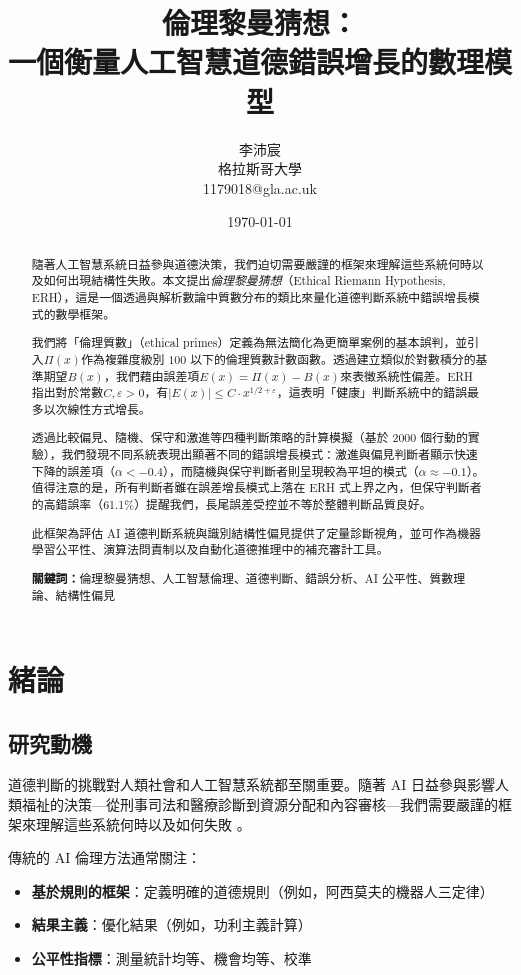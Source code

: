 \documentclass[12pt,a4paper]{article}
\title{倫理黎曼猜想：\\
       一個衡量人工智慧道德錯誤增長的數理模型}
\author{李沛宸 \\
        格拉斯哥大學 \\
        1179018@gla.ac.uk}
\date{\today}
\theoremstyle{definition}
\theoremstyle{remark}
\begin{document}
\maketitle

\begin{abstract}
隨著人工智慧系統日益參與道德決策，我們迫切需要嚴謹的框架來理解這些系統何時以及如何出現結構性失敗。本文提出\emph{倫理黎曼猜想}（Ethical Riemann Hypothesis, ERH），這是一個透過與解析數論中質數分布的類比來量化道德判斷系統中錯誤增長模式的數學框架。

我們將「倫理質數」（ethical primes）定義為無法簡化為更簡單案例的基本誤判，並引入$\Pi(x)$作為複雜度級別 $100$ 以下的倫理質數計數函數。透過建立類似於對數積分的基準期望$B(x)$，我們藉由誤差項$E(x) = \Pi(x) - B(x)$來表徵系統性偏差。ERH 指出對於常數$C, \varepsilon > 0$，有$|E(x)| \leq C \cdot x^{1/2 + \varepsilon}$，這表明「健康」判斷系統中的錯誤最多以次線性方式增長。

透過比較偏見、隨機、保守和激進等四種判斷策略的計算模擬（基於 2000 個行動的實驗），我們發現不同系統表現出顯著不同的錯誤增長模式：激進與偏見判斷者顯示快速下降的誤差項（$\alpha < -0.4$），而隨機與保守判斷者則呈現較為平坦的模式（$\alpha \approx -0.1$）。值得注意的是，所有判斷者雖在誤差增長模式上落在 ERH 式上界之內，但保守判斷者的高錯誤率（61.1\%）提醒我們，長尾誤差受控並不等於整體判斷品質良好。

此框架為評估 AI 道德判斷系統與識別結構性偏見提供了定量診斷視角，並可作為機器學習公平性、演算法問責制以及自動化道德推理中的補充審計工具。

\textbf{關鍵詞：}倫理黎曼猜想、人工智慧倫理、道德判斷、錯誤分析、AI 公平性、質數理論、結構性偏見
\end{abstract}

\section{緒論}
\label{sec:introduction}

\subsection{研究動機}

道德判斷的挑戰對人類社會和人工智慧系統都至關重要。隨著 AI 日益參與影響人類福祉的決策---從刑事司法和醫療診斷到資源分配和內容審核---我們需要嚴謹的框架來理解這些系統何時以及如何失敗 \citep{jobin2019,floridi2018}。

傳統的 AI 倫理方法通常關注：
\begin{itemize}
    \item \textbf{基於規則的框架}：定義明確的道德規則（例如，阿西莫夫的機器人三定律）
    \item \textbf{結果主義}：優化結果（例如，功利主義計算）
    \item \textbf{公平性指標}：測量統計均等、機會均等、校準 \citep{hardt2016,dwork2012}
\end{itemize}
\end{document}
